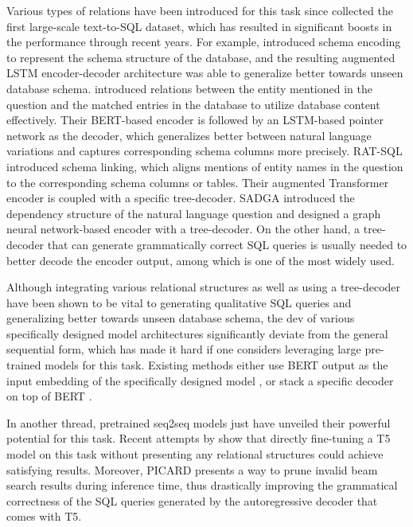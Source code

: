 \documentclass[11pt]{article}
\begin{document}
Various types of relations have been introduced for this task since \citet{zhong2017seq2sql} collected the first large-scale text-to-SQL dataset, which has resulted in significant boosts in the performance through recent years. For example, \citet{bogin2019representing} introduced schema encoding to represent the schema structure of the database, and the resulting augmented LSTM encoder-decoder architecture was able to generalize better towards unseen database schema. \citet{lin2020bridging} introduced relations between the entity mentioned in the question and the matched entries in the database to utilize database content effectively. Their BERT-based encoder is followed by an LSTM-based pointer network as the decoder, which generalizes better between natural language variations and captures corresponding schema columns more precisely. RAT-SQL \citep{wang-etal-2020-rat} introduced schema linking, which aligns mentions of entity names in the question to the corresponding schema columns or tables. Their augmented Transformer encoder is coupled with a specific tree-decoder. SADGA \citep{NEURIPS2021_3f1656d9} introduced the dependency structure of the natural language question and designed a graph neural network-based encoder with a tree-decoder. On the other hand, a tree-decoder that can generate grammatically correct SQL queries is usually needed to better decode the encoder output, among which  \citet{yin-neubig-2017-syntactic} is one of the most widely used.

Although integrating various relational structures as well as using a tree-decoder have been shown to be vital to generating qualitative SQL queries and generalizing better towards unseen database schema, the dev of various specifically designed model architectures significantly deviate from the general sequential form, which has made it hard if one considers leveraging large pre-trained models for this task. Existing methods either use BERT output as the input embedding of the specifically designed model \citep{cao-etal-2021-lgesql, choi-etal-2021-ryansql, wang-etal-2020-rat, guo-etal-2019-towards}, or stack a specific decoder on top of BERT \citep{lin2020bridging}.

In another thread, pretrained seq2seq models just have unveiled their powerful potential for this task. Recent attempts by \citet{shaw-etal-2021-compositional} show that directly fine-tuning a T5 model \citep{raffel2020t5} on this task without presenting any relational structures could achieve satisfying results. Moreover, PICARD \citep{scholak-etal-2021-picard} presents a way to prune invalid beam search results during inference time, thus drastically improving the grammatical correctness of the SQL queries generated by the autoregressive decoder that comes with T5. 
\end{document}
